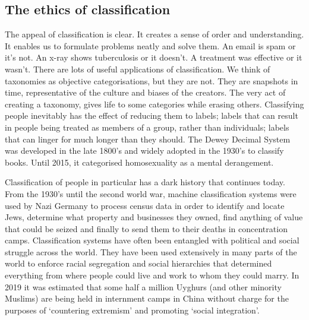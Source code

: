 \subsection{The ethics of classification}

The appeal of classification is clear. It creates a sense of order and understanding. It enables us to formulate problems neatly and solve them. An email is spam or it's not. An x-ray shows tuberculosis or it doesn't. A treatment was effective or it wasn't. There are lots of useful applications of classification. We think of taxonomies as objective categorisations, but they are not. They are snapshots in time, representative of the culture and biases of the creators. The very act of creating a taxonomy, gives life to some categories while erasing others. Classifying people inevitably has the effect of reducing them to labels; labels that can result in people being treated as members of a group, rather than individuals; labels that can linger for much longer than they should. The Dewey Decimal System was developed in the late 1800's and widely adopted in the 1930's to classify books. Until 2015, it categorised homosexuality as a mental derangement.

Classification of people in particular has a dark history that continues today. From the 1930's until the second world war, machine classification systems were used by Nazi Germany to process census data in order to identify and locate Jews, determine what property and businesses they owned, find anything of value that could be seized and finally to send them to their deaths in concentration camps. Classification systems have often been entangled with political and social struggle across the world. They have been used extensively in many parts of the world to enforce racial segregation and social hierarchies that determined everything from where people could live and work to whom they could marry. In 2019 it was estimated that some half a million Uyghurs (and other minority Muslims) are being held in internment camps in China without charge for the purposes of `countering extremism' and promoting `social integration'.

